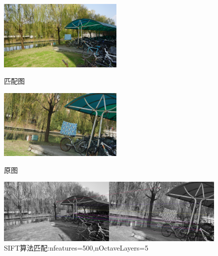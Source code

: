 \documentclass{article}
\begin{document}
        \begin{figure}[htbp]
                \begin{minipage}[t]{0.5\linewidth}\centering
                \includegraphics[width=6cm]{Pic1-1.png}
                \caption{匹配图}\label{2-a}
                \end{minipage}
                \begin{minipage}[t]{0.5\linewidth}\centering
                \includegraphics[width=6cm]{Pic1-2.png}
                \caption{原图}\label{2-b}
                \end{minipage}
                \begin{minipage}[t]{1\linewidth}\centering
                \includegraphics[width=12cm]{sift_matches_Pic1.jpg}
                \caption{SIFT算法匹配:nfeatures=500,nOctaveLayers=5}\label{2-c}
                \end{minipage}
        \end{figure}
\end{document}
